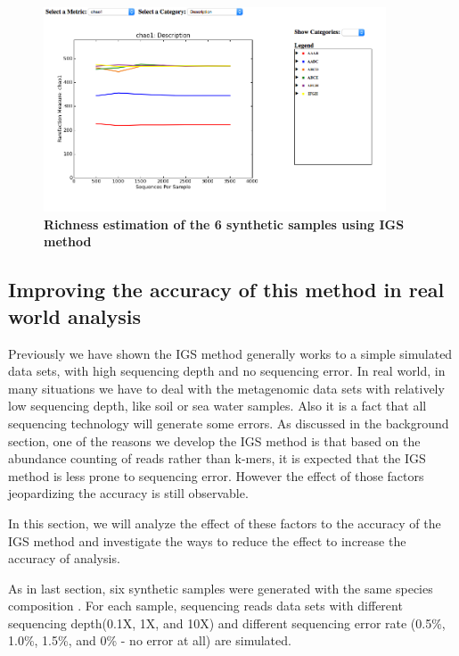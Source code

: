 \documentclass[12pt]{report}
\begin{document}
\begin{figure}[!ht]
 \centerline{\includegraphics[width=4in]{./figures/simple_chao_alpha.png}}
\caption{\bf Richness estimation of the 6 synthetic samples using IGS method}
\label{fig:simple_alpha}
\end{figure}


\subsection{Improving the accuracy of this method in real world analysis}


Previously we have shown the IGS method generally works to a simple simulated
 data sets, with high sequencing depth and no sequencing error. In real world,
in many situations we have to deal with the metagenomic data sets with 
relatively low sequencing depth, like soil or sea water samples. 
Also it is a fact that all sequencing technology will generate some errors. As 
discussed in the background 
section, one of the reasons we develop the IGS method is that based on the 
abundance counting of reads rather than k-mers, it is expected that the IGS 
method is less prone to sequencing error. However the effect of those factors 
jeopardizing the accuracy is still observable. 

In this section, we will analyze the effect of these factors to the accuracy of
 the IGS method and investigate the ways to reduce the effect to increase the 
accuracy of analysis.


As in last section, six synthetic samples were generated with the same species 
composition . For each sample, sequencing reads data sets with different
sequencing depth(0.1X, 1X, and 10X) and different sequencing error rate (0.5\%,
 1.0\%, 1.5\%, and 0\% - no error at all) are simulated.
\end{document}
